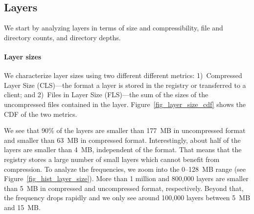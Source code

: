 \subsection{Layers}
\label{sec:layers}

We start by analyzing layers in terms of size and compressibility, file and directory
counts, and directory depths.




\paragraph{Layer sizes}
%
We characterize layer sizes using two different different metrics:
%
1)~Compressed Layer Size (CLS)---the format a layer is stored in the registry or
transferred to a client;
%
%
and 2)~Files in Layer Size (FLS)---the sum of the sizes of the uncompressed files contained
in the layer.
%
Figure~\ref{fig_layer_size_cdf} shows the CDF of the two metrics.


We see that 90\% of the layers are smaller than 177~MB in uncompressed 
format and smaller than 63~MB in compressed format.
%
Interestingly, about half of the layers are smaller than 4~MB, independent
of the format. That means that the registry stores a large number of
small layers which cannot benefit from compression.
%
%
%
To analyze the frequencies, we zoom into the 0--128~MB range
(see Figure~\ref{fig_hist_layer_size}).
%
More than 1 million and 800,000 layers are smaller than 5~MB
in compressed and uncompressed format, respectively. Beyond that,
the frequency drops rapidly and we only see around 100,000 layers
between 5~MB and 15~MB.




